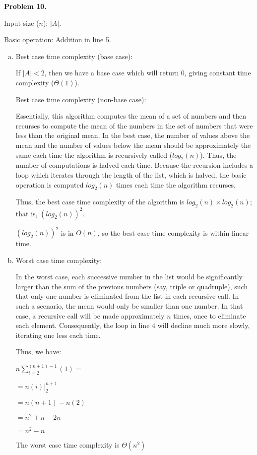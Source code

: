 \documentclass{article}
\begin{document}
\textbf{Problem 10.}

	Input size ($n$): $|A|$.
	
	Basic operation: Addition in line 5. 

	\begin{enumerate}[a.]
		\item Best case time complexity (base case):
		
			If $|A| < 2$, then we have a base case which will return 0, giving constant time complexity ($\Theta(1)$).
			
			Best case time complexity (non-base case):
		
			Essentially, this algorithm computes the mean of a set of numbers and then recurses to compute the mean of the numbers in the set of numbers that were less than the original mean.  In the best case, the number of values above the mean and the number of values below the mean should be approximately the same each time the algorithm is recursively called ($log_{2}(n)$).  Thus, the number of computations is halved each time.  Because the recursion includes a loop which iterates through the length of the list, which is halved, the basic operation is computed $log_{2}(n)$ times each time the algorithm recurses.
			
			Thus, the best case time complexity of the algorithm is $log_{2}(n) \times log_{2}(n)$; that is, $(log_{2}(n))^2$.
			
			$(log_{2}(n))^2$ is in $O(n)$, so the best case time complexity is within linear time.
		
		\item Worst case time complexity:
		
		In the worst case, each successive number in the list would be significantly larger than the sum of the previous numbers (say, triple or quadruple), such that only one number is eliminated from the list in each recursive call.  In such a scenario, the mean would only be smaller than one number.  In that case, a recursive call will be made approximately $n$ times, once to eliminate each element.  Consequently, the loop in line 4 will decline much more slowly, iterating one less each time.
		
		Thus, we have:
		
		$n \sum_{i = 2}^{(n + 1) - 1}(1) = $
		
		$ = n(i) \rvert_{2}^{n + 1}$
		
		$ = n(n + 1) - n(2)$
		
		$ = n^2 + n - 2n$
		
		$ = n^2 - n$
		
		The worst case time complexity is $\Theta(n^2)$
	\end{enumerate}
\end{document}
